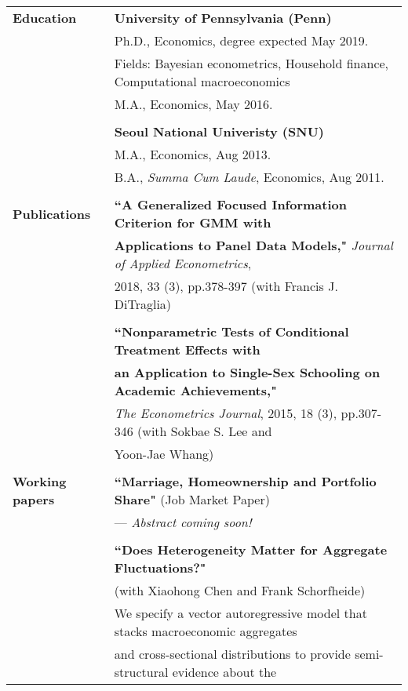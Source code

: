 \documentclass[letterpaper,11pt,oneside]{article}
\begin{document}
\noindent \begin{tabular}{@{} l l}
 \large{\textbf{Education}} 
    & \textbf{University of Pennsylvania (Penn)} \\
     & Ph.D., Economics, degree expected May 2019. \\
     & Fields: Bayesian econometrics, Household finance, Computational macroeconomics \\
     & M.A., Economics, May 2016. \\
     & \\
     & \textbf{Seoul National Univeristy (SNU)} \\
          & M.A., Economics, Aug 2013. \\
     & B.A., \textit{Summa Cum Laude}, Economics, Aug 2011. \\
     \vspace{0.1in} \\
      \large{\textbf{Publications}}    & \textbf{``A Generalized Focused Information Criterion for GMM with } \\
 &\textbf{Applications to Panel Data Models,"}  \textit{Journal of Applied Econometrics},\\
 & 2018, 33 (3), pp.378-397 (with Francis J. DiTraglia) \\
    & \\
 & \textbf{``Nonparametric Tests of Conditional Treatment Effects with}\\
 & \textbf{an Application to Single-Sex Schooling on Academic Achievements,"} \\
 & \textit{The Econometrics Journal}, 2015, 18 (3), pp.307-346 (with Sokbae S. Lee and \\
 & Yoon-Jae Whang) \\ 
  \vspace{0.1in} \\
 \large{\textbf{Working papers}}    & \textbf{``Marriage, Homeownership and Portfolio Share"} (Job Market Paper)\\
 & --- \textit{Abstract coming soon!}\\[0.1in]
    & \\
  & \textbf{``Does Heterogeneity Matter for Aggregate Fluctuations?"}\\
  & (with Xiaohong Chen and Frank Schorfheide)\\[0.05in] 
  & We specify a vector autoregressive model that stacks macroeconomic aggregates\\
 & and cross-sectional distributions to provide semi-structural evidence about the \\

\end{tabular}
\end{document}
